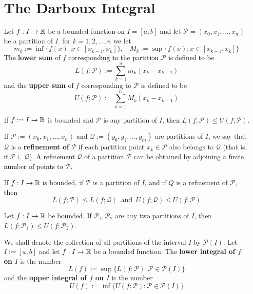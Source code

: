 \section{The Darboux Integral}

\begin{definition}
	Let $f:I \to \mathbb{R}$ be a bounded function on $I=[a,b]$ and let $\mathcal{P}=(x_0,x_1,\dots,x_n)$ be a partition of $I$. for $k=1,2,\dots,n$ we let
	\[m_k:=\inf \{f(x):x \in [x_{k-1},x_k]\},\ \ \ \ M_k:=\sup \{f(x):x \in [x_{k-1},x_k]\}\]
	The \textbf{lower sum} of $f$ corresponding to the partition $\mathcal{P}$ is defined to be
	\[L(f;\mathcal{P}):= \sum\limits_{k=1}^{n}m_k(x_k-x_{k-1})\]
	and the \textbf{upper sum} of $f$ corresponding to $\mathcal{P}$ is defined to be
	\[U(f;\mathcal{P}):=\sum\limits_{k=1}^{n}M_k(x_k-x_{k-1})\]
\end{definition}

\begin{lemma}
	If $f:=I\to\mathbb{R}$ is bounded and $\mathcal{P}$ is any partition of $I$, then $L(f;\mathcal{P})\leq U(f;\mathcal{P})$.
\end{lemma}

\begin{definition}
	If $\mathcal{P}:=(x_0,x_1,\dots,x_n)$ and $\mathcal{Q}:=(y_0,y_1,\dots,y_m)$ are partitions of $I$, we say that $\mathcal{Q}$ is a \textbf{refinement of } $\mathcal{P}$ if each partition point $x_k \in \mathcal{P}$ also belongs to $\mathcal{Q}$ (that is, if $\mathcal{P} \subseteq \mathcal{Q}$). A refinement $\mathcal{Q}$ of a partition $\mathcal{P}$ can be obtained by adjoining a finite number of points to $\mathcal{P}$.
\end{definition}

\begin{lemma}
	If $f:I\to\mathbb{R}$ is bounded, if $\mathcal{P}$ is a partition of $I$, and if $Q$ is a refinement of $\mathcal{P}$, then
	\[L(f;\mathcal{P})\leq L(f;\mathcal{Q})\ \text{ and }\ U(f;\mathcal{Q})\leq U(f;\mathcal{P})\]
\end{lemma}

\begin{lemma}
	Let $f:I\to\mathbb{R}$ be bounded. If $\mathcal{P}_1,\mathcal{P}_2$ are any two partitions of $I$, then $L(f;\mathcal{P}_1)\leq U(f;\mathcal{P}_2)$.
\end{lemma}

\begin{definition}
	We shall denote the collection of all partitions of the interval $I$ by $\mathscr{P}(I)$. Let $I:=[a,b]$ and let $f:I \to \mathbb{R}$ be a bounded function. The \textbf{lower integral of $f$ on $I$} is the number
	\[L(f):=\sup\{L(f;\mathcal{P}):\mathcal{P} \in \mathscr{P}(I)\}\]
	and the \textbf{upper integral of $f$ on $I$} is the number
	\[U(f):=\inf\{U(f;\mathcal{P}):\mathcal{P} \in \mathscr{P}(I)\}\]
\end{definition}

